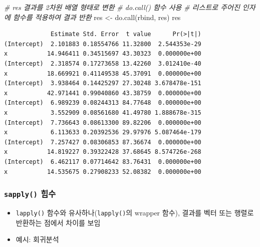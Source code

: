 \documentclass[
  11pt,
]{krantz}
\newenvironment{Shaded}{\begin{snugshade}}{\end{snugshade}}
\newcommand{\CommentTok}[1]{\textcolor[rgb]{0.37,0.37,0.37}{\textit{#1}}}
\newcommand{\ControlFlowTok}[1]{\textcolor[rgb]{0.27,0.27,0.27}{\textbf{#1}}}
\newcommand{\DecValTok}[1]{\textcolor[rgb]{0.06,0.06,0.06}{#1}}
\newcommand{\FunctionTok}[1]{\textcolor[rgb]{0,0,0}{#1}}
\newcommand{\NormalTok}[1]{#1}
\newcommand{\OtherTok}[1]{\textcolor[rgb]{0.37,0.37,0.37}{#1}}
\newcommand{\SpecialCharTok}[1]{\textcolor[rgb]{0,0,0}{#1}}
\providecommand{\tightlist}{%
  \setlength{\itemsep}{0pt}\setlength{\parskip}{0pt}}
\begin{document}
\begin{Shaded}
\begin{Highlighting}[]
\CommentTok{\# res 결과를 2차원 배열 형태로 변환}
\CommentTok{\# do.call() 함수 사용}
\CommentTok{\# 리스트로 주어진 인자에 함수를 적용하여 결과 반환}
\NormalTok{res }\OtherTok{\textless{}{-}} \FunctionTok{do.call}\NormalTok{(rbind, res)  }
\NormalTok{res}
\end{Highlighting}
\end{Shaded}

\begin{verbatim}
             Estimate Std. Error  t value      Pr(>|t|)
(Intercept)  2.101883 0.18554766 11.32800  2.544353e-29
x           14.946411 0.34515697 43.30323  0.000000e+00
(Intercept)  2.318574 0.17273658 13.42260  3.012410e-40
x           18.669921 0.41149538 45.37091  0.000000e+00
(Intercept)  3.938464 0.14425297 27.30248 3.678478e-151
x           42.971441 0.99040860 43.38759  0.000000e+00
(Intercept)  6.989239 0.08244313 84.77648  0.000000e+00
x            3.552909 0.08561680 41.49780 1.888678e-315
(Intercept)  7.736643 0.08613300 89.82206  0.000000e+00
x            6.113633 0.20392536 29.97976 5.087464e-179
(Intercept)  7.257427 0.08306853 87.36674  0.000000e+00
x           14.819227 0.39322428 37.68645 8.574726e-268
(Intercept)  6.462117 0.07714642 83.76431  0.000000e+00
x           14.535675 0.27908233 52.08382  0.000000e+00
\end{verbatim}

\normalsize

\hypertarget{sapply}{%
\subsubsection*{\texorpdfstring{\texttt{sapply()} 힘수}{sapply() 힘수}}\label{sapply}}


\begin{itemize}
\tightlist
\item
  \texttt{lapply()} 함수와 유사하나(\texttt{lapply()}의 wrapper 함수), 결과를 벡터 또는 행렬로 반환하는 점에서 차이를 보임
\item
  예시: 회귀분석
\end{itemize}

\footnotesize

\begin{Shaded}
\end{Shaded}
\end{document}
